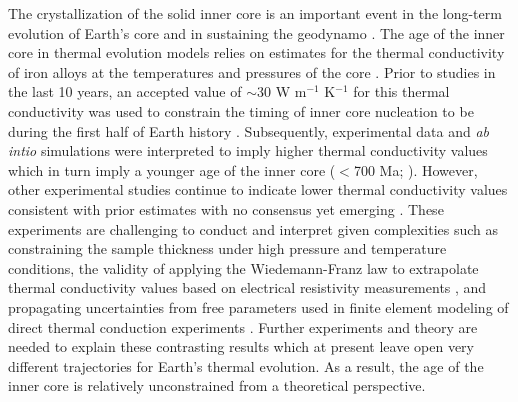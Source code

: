 \documentclass[9pt,twocolumn,twoside,lineno]{pnas-new}
\begin{document}
The crystallization of the solid inner core is an important event in the long-term evolution of Earth's core and in sustaining the geodynamo \cite{Buffett2000a}. The age of the inner core in thermal evolution models relies on estimates for the thermal conductivity of iron alloys at the temperatures and pressures of the core \cite{Ohta2021a}. Prior to studies in the last 10 years, an accepted value of $\sim$30 W m$^{-1}$ K$^{-1}$ for this thermal conductivity was used to constrain the timing of inner core nucleation to be during the first half of Earth history \cite{Stacey2007a, Konopkova2016a}. Subsequently, experimental data and \textit{ab intio} simulations were interpreted to imply higher thermal conductivity values \cite{Pozzo2012a, Ohta2016a} which in turn imply a younger age of the inner core ($<$700 Ma; \citealp{Labrosse2015a}). However, other experimental studies continue to indicate lower thermal conductivity values consistent with prior estimates \cite{Konopkova2016a, Hsieh2020a} with no consensus yet emerging \cite{Williams2018a, Ohta2021a}. These experiments are challenging to conduct and interpret given complexities such as constraining the sample thickness under high pressure and temperature conditions, the validity of applying the Wiedemann-Franz law to extrapolate thermal conductivity values based on electrical resistivity measurements \cite{Ohta2016a}, and propagating uncertainties from free parameters used in finite element modeling of direct thermal conduction experiments \cite{Konopkova2016a}. Further experiments and theory are needed to explain these contrasting results which at present leave open very different trajectories for Earth's thermal evolution. As a result, the age of the inner core is relatively unconstrained from a theoretical perspective. 
\end{document}
